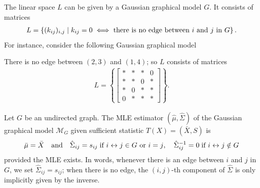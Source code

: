 \begin{eg}
  The linear space \( L \) can be given by a Gaussian graphical model \( G \). It consists of matrices  
  \begin{align*}
    L = \left\{ (k_{ij})_{i,j}  \mid k_{ij} = 0 \iff \text{there is no edge between \( i \) and \( j \) in \( G \)}  \right\}.
  \end{align*}
  For instance, consider the following Gaussian graphical model 
  \begin{figure}[H]
    \centering
  \end{figure}
  There is no edge between \( (2,3)  \)  and \( (1,4) \); so \( L \) consists of matrices 
  \begin{align*}
    L = \left\{ \begin{bmatrix}* & * & * & 0 \\ * & * & 0 & * \\ * & 0 & * & * \\ 0 & * & * & *\end{bmatrix} \right\}.
  \end{align*}
\end{eg}

\begin{thm}
  Let \( G \) be an undirected graph. The MLE estimator \( (\hat \mu, \hat \Sigma) \) of the Gaussian graphical model \( \mathcal{M}_G \) given sufficient statistic \( T(X) = (\bar X, S) \) is 
  \begin{align*}
    \bar \mu = \bar X \quad \text{and} \quad \hat \Sigma_{ij} = s_{ij}\; \text{if \( i \leftrightarrow j \in G \) or \( i=j \)}, \quad  \hat \Sigma^{-1}_{ij} =0 \; \text{if \( i \leftrightarrow j \notin G \)}
  \end{align*}
  provided the MLE exists. In words, whenever there is an edge between \( i \) and \( j \) in \( G \), we set \( \hat \Sigma_{ij} = s_{ij} \); when there is no edge, the \( (i,j) \)-th component of \( \hat \Sigma \) is only implicitly given by the inverse.
\end{thm}

